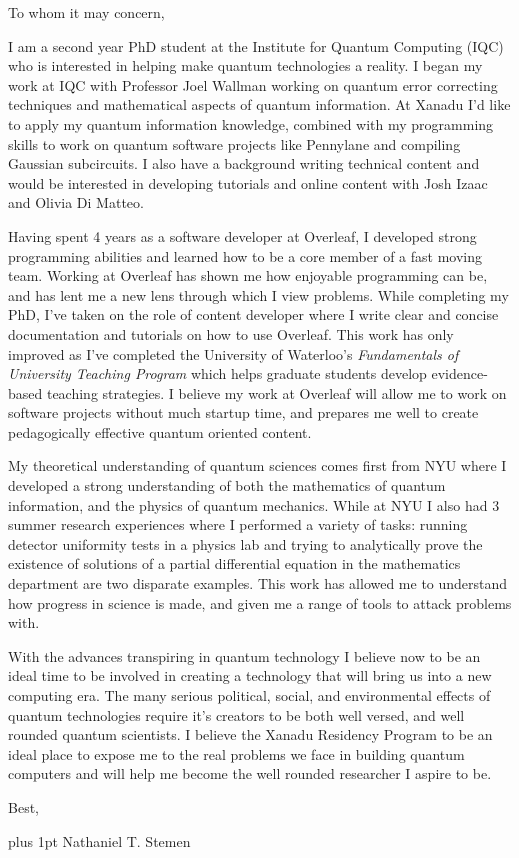 \documentclass[12pt]{article}
\begin{document}
\noindent
To whom it may concern,

I am a second year PhD student at the Institute for Quantum Computing (IQC) who is interested in helping make quantum technologies a reality.
I began my work at IQC with Professor Joel Wallman working on quantum error correcting techniques and mathematical aspects of quantum information.
At Xanadu I'd like to apply my quantum information knowledge, combined with my programming skills to work on quantum software projects like Pennylane and compiling Gaussian subcircuits.
I also have a background writing technical content and would be interested in developing tutorials and online content with Josh Izaac and Olivia Di Matteo.

Having spent 4 years as a software developer at Overleaf, I developed strong programming abilities and learned how to be a core member of a fast moving team.
Working at Overleaf has shown me how enjoyable programming can be, and has lent me a new lens through which I view problems.
While completing my PhD, I've taken on the role of content developer where I write clear and concise documentation and tutorials on how to use Overleaf.
This work has only improved as I've completed the University of Waterloo's \emph{Fundamentals of University Teaching Program} which helps graduate students develop evidence-based teaching strategies.
I believe my work at Overleaf will allow me to work on software projects without much startup time, and prepares me well to create pedagogically effective quantum oriented content.

My theoretical understanding of quantum sciences comes first from NYU where I developed a strong understanding of both the mathematics of quantum information, and the physics of quantum mechanics.
While at NYU I also had 3 summer research experiences where I performed a variety of tasks: running detector uniformity tests in a physics lab and trying to analytically prove the existence of solutions of a partial differential equation in the mathematics department are two disparate examples.
This work has allowed me to understand how progress in science is made, and given me a range of tools to attack problems with.

With the advances transpiring in quantum technology I believe now to be an ideal time to be involved in creating a technology that will bring us into a new computing era.
The many serious political, social, and environmental effects of quantum technologies require it's creators to be both well versed, and well rounded quantum scientists.
I believe the Xanadu Residency Program to be an ideal place to expose me to the real problems we face in building quantum computers and will help me become the well rounded researcher I aspire to be.

\noindent
Best,

\parskip=0pt plus 1pt
Nathaniel T. Stemen
\end{document}
